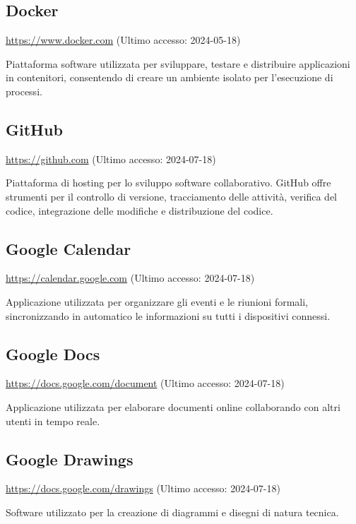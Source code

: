 \subsection{Docker}
\par \href{https://www.docker.com}{https://www.docker.com} (Ultimo accesso: 2024-05-18)
\par Piattaforma software utilizzata per sviluppare, testare e distribuire applicazioni in contenitori, consentendo di creare un ambiente isolato per l'esecuzione di processi.

\subsection{GitHub}
\par \href{https://github.com}{https://github.com} (Ultimo accesso: 2024-07-18)
\par Piattaforma di hosting per lo sviluppo software collaborativo. GitHub offre strumenti per il controllo di versione, tracciamento delle attività, verifica del codice, integrazione delle modifiche e distribuzione del codice.
    
\subsection{Google Calendar}
\par \href{https://calendar.google.com}{https://calendar.google.com} (Ultimo accesso: 2024-07-18)
\par Applicazione utilizzata per organizzare gli eventi e le riunioni formali, sincronizzando in automatico le informazioni su tutti i dispositivi connessi.
    
\subsection{Google Docs}
\par \href{https://docs.google.com/document}{https://docs.google.com/document} (Ultimo accesso: 2024-07-18)
\par Applicazione utilizzata per elaborare documenti online collaborando con altri utenti in tempo reale.

\subsection{Google Drawings}
\par \href{https://docs.google.com/drawings}{https://docs.google.com/drawings} (Ultimo accesso: 2024-07-18)
\par Software utilizzato per la creazione di diagrammi e disegni di natura tecnica.

